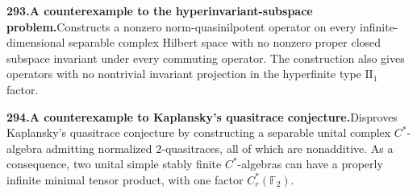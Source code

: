 \documentclass[11pt,a4paper]{article}
\begin{document}
  \par \begin{minipage}{\linewidth}
  \fontsize{10.5}{12.6}\selectfont\RaggedRight
  \hypertarget{result 293}{}
  {\bfseries\textcolor{muted}{293.}\enspace A counterexample to the hyperinvariant-subspace problem.}\enspace Constructs a nonzero norm-quasinilpotent operator on every infinite-dimensional separable complex Hilbert space with no nonzero proper closed subspace invariant under every commuting operator. The construction also gives operators with no nontrivial invariant projection in the hyperfinite type $\mathrm{II}_1$ factor.\par
  \end{minipage}\par\vspace{5pt}



  \par \begin{minipage}{\linewidth}
  \fontsize{10.5}{12.6}\selectfont\RaggedRight
  \hypertarget{result 294}{}
  {\bfseries\textcolor{muted}{294.}\enspace A counterexample to Kaplansky's quasitrace conjecture.}\enspace Disproves Kaplansky's quasitrace conjecture by constructing a separable unital complex $C^*$-algebra admitting normalized $2$-quasitraces, all of which are nonadditive. As a consequence, two unital simple stably finite $C^*$-algebras can have a properly infinite minimal tensor product, with one factor $C_r^*(\mathbb F_2)$.\par
  \end{minipage}\par\vspace{5pt}
\end{document}
